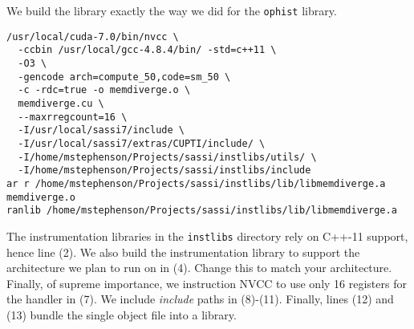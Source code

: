 We build the library exactly the way we did for the \texttt{ophist}
library.

\begin{lstlisting}[style=BashInputStyle]
/usr/local/cuda-7.0/bin/nvcc \
  -ccbin /usr/local/gcc-4.8.4/bin/ -std=c++11 \
  -O3 \
  -gencode arch=compute_50,code=sm_50 \
  -c -rdc=true -o memdiverge.o \
  memdiverge.cu \
  --maxrregcount=16 \
  -I/usr/local/sassi7/include \
  -I/usr/local/sassi7/extras/CUPTI/include/ \
  -I/home/mstephenson/Projects/sassi/instlibs/utils/ \
  -I/home/mstephenson/Projects/sassi/instlibs/include
ar r /home/mstephenson/Projects/sassi/instlibs/lib/libmemdiverge.a memdiverge.o
ranlib /home/mstephenson/Projects/sassi/instlibs/lib/libmemdiverge.a
\end{lstlisting}

The instrumentation libraries in the \texttt{instlibs} directory rely on C++-11 support,
hence line (2).  We also build the instrumentation library to support
the architecture we plan to run on in (4).  Change this to match your
architecture.  Finally, of supreme importance, we instruction NVCC to
use only 16 registers for the handler in (7).  We include
\emph{include} paths in (8)-(11).  Finally, lines (12) and (13) bundle
the single object file into a library.
